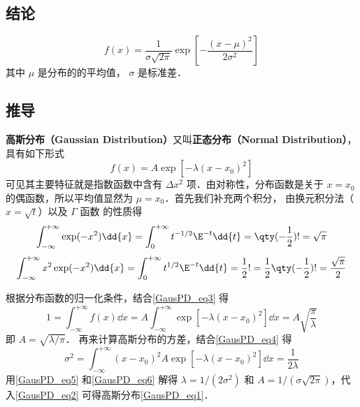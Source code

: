 
\subsection{结论}
\begin{equation}\label{GausPD_eq1}
f(x) = \frac{1}{\sigma \sqrt{2\pi }} \exp[-\frac{(x - \mu )^2}{2\sigma ^2}]
\end{equation}
其中 $\mu$ 是分布的的平均值， $\sigma$ 是标准差．

\subsection{推导}
\textbf{高斯分布（Gaussian Distribution）}又叫\textbf{正态分布（Normal Distribution）}， 具有如下形式
\begin{equation}\label{GausPD_eq2}
f(x) = A\exp[-\lambda (x - x_0)^2]
\end{equation}
可见其主要特征就是指数函数中含有 $\Delta x^2$ 项．由对称性，分布函数是关于 $x =x_0$ 的偶函数，所以平均值显然为 $\mu = x_0$．首先我们补充两个积分， 由换元积分法（$x=\sqrt{t}$）以及 $\Gamma$ 函数 的性质得
\begin{equation}\label{GausPD_eq3}
\int_{-\infty }^{+\infty } \exp (-x^2)\dd{x}  = \int_0^{+\infty} t^{-1/2}\E^{ - t} \dd{t}  = \qty(-\frac12)! = \sqrt \pi 
\end{equation}
\begin{equation}\label{GausPD_eq4}
\int_{-\infty}^{+\infty} x^2\exp(-x^2)\dd{x}  = \int_0^{+\infty} t^{1/2}\E^{-t} \dd{t}  = \frac12 ! = \frac12 \qty(-\frac12)! = \frac{\sqrt\pi}{2}
\end{equation}

根据分布函数的归一化条件，结合\autoref{GausPD_eq3} 得
\begin{equation}\label{GausPD_eq5}
1 = \int_{-\infty}^{+\infty} f(x) \dd{x}  = A\int_{-\infty}^{+\infty} \exp[-\lambda (x - x_0)^2] \dd{x}  = A\sqrt{\frac{\pi}{\lambda}}
\end{equation}
即 $A = \sqrt{\lambda/\pi}$． 再来计算高斯分布的方差，结合\autoref{GausPD_eq4} 得
\begin{equation}\label{GausPD_eq6}
\sigma ^2 = \int_{-\infty}^{+\infty} (x - x_0)^2 A\exp[-\lambda (x - x_0)^2] \dd{x}  = \frac{1}{2\lambda}
\end{equation}
用\autoref{GausPD_eq5} 和\autoref{GausPD_eq6} 解得 $\lambda = 1/(2\sigma^2)$ 和 $A = 1/(\sigma\sqrt{2\pi})$，代入\autoref{GausPD_eq2} 可得高斯分布\autoref{GausPD_eq1}．